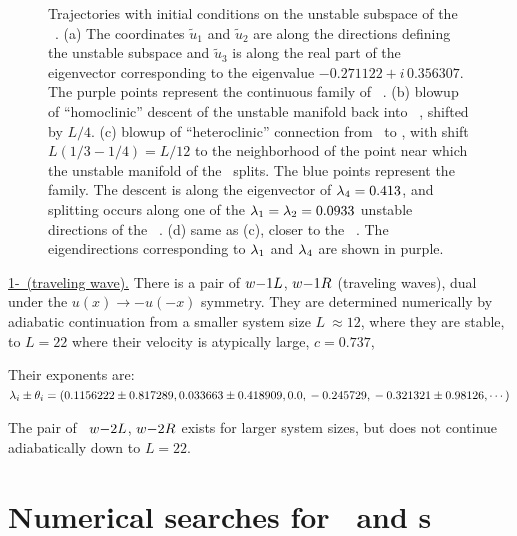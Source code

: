 {\begin{figure}[t]
\begin{center}
\end{center}
\caption{
 Trajectories with initial conditions on the unstable subspace of
 the ~\eqv.
 (a) The coordinates $\tilde{u}_1$ and $\tilde{u}_2$
 are along the directions defining the unstable subspace
 and $\tilde{u}_3$  is along the real part of the eigenvector
 corresponding to the eigenvalue $-0.271122+ i\, 0.356307$.
The purple points represent the continuous family
 of
~\eqva.
(b) blowup of ``homoclinic'' descent of the unstable manifold
back into ~\eqv, shifted by
$L/4$.
(c) blowup of ``heteroclinic'' connection from
 \eqv\ to  \eqv, with shift
$L(1/3-1/4) = L/12$
to the neighborhood of the point near which the
unstable manifold of the
 \eqv\ splits. The blue points
represent the
 {\eqv} family.
The descent is along the eigenvector of $\lambda_4= 0.413$,
and splitting
occurs along one of the
$\lambda_1=\lambda_2=0.0933$
unstable directions of the ~{\eqv}.
(d) same as (c), closer to the ~{\eqv}.
The eigendirections corresponding to $\lambda_1$
and $\lambda_4$ are shown in purple.
}
\end{figure}

\underline{1-\reqv\  (traveling wave).}
There is a pair of {\reqva}
${w-}1L$,
${w-}1R$
(traveling waves), dual under the
$u(x) \to -u(-x)$ symmetry. They are
determined numerically by
adiabatic continuation from a smaller system size
$L~\approx 12$,
where they are stable, to $L=22$
where their velocity is atypically large, $c=0.737$,

Their exponents are:
\\
$\lambda_i \pm \theta_i =
(
\\
  0.1156222 \pm 0.817289,   \\
  0.033663 \pm 0.418909,    \\
 0.0                    ,   \\
 -0.245729                    , \\
 -0.321321 \pm 0.98126,
\cdots
)$

The pair of \reqva\
${w-}2L$,
${w-}2R$
exists for larger system sizes, but does not continue
adiabatically down to $L=22$.


\section*{Numerical searches for \reqva\ and \rpo s}

}

